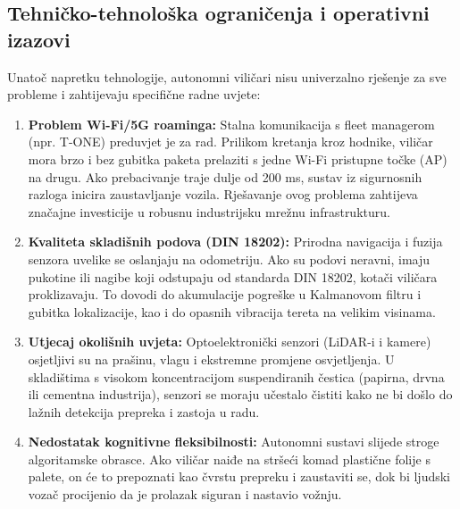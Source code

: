 \subsection{Tehničko-tehnološka ograničenja i operativni izazovi}
Unatoč napretku tehnologije, autonomni viličari nisu univerzalno rješenje za sve probleme i zahtijevaju specifične radne uvjete:
\begin{enumerate}
    \item \textbf{Problem Wi-Fi/5G roaminga:} Stalna komunikacija s fleet managerom (npr. T-ONE) preduvjet je za rad. Prilikom kretanja kroz hodnike, viličar mora brzo i bez gubitka paketa prelaziti s jedne Wi-Fi pristupne točke (AP) na drugu. Ako prebacivanje traje dulje od 200 ms, sustav iz sigurnosnih razloga inicira zaustavljanje vozila. Rješavanje ovog problema zahtijeva značajne investicije u robusnu industrijsku mrežnu infrastrukturu.
    \item \textbf{Kvaliteta skladišnih podova (DIN 18202):} Prirodna navigacija i fuzija senzora uvelike se oslanjaju na odometriju. Ako su podovi neravni, imaju pukotine ili nagibe koji odstupaju od standarda DIN 18202, kotači viličara proklizavaju. To dovodi do akumulacije pogreške u Kalmanovom filtru i gubitka lokalizacije, kao i do opasnih vibracija tereta na velikim visinama.
    \item \textbf{Utjecaj okolišnih uvjeta:} Optoelektronički senzori (LiDAR-i i kamere) osjetljivi su na prašinu, vlagu i ekstremne promjene osvjetljenja. U skladištima s visokom koncentracijom suspendiranih čestica (papirna, drvna ili cementna industrija), senzori se moraju učestalo čistiti kako ne bi došlo do lažnih detekcija prepreka i zastoja u radu.
    \item \textbf{Nedostatak kognitivne fleksibilnosti:} Autonomni sustavi slijede stroge algoritamske obrasce. Ako viličar naiđe na stršeći komad plastične folije s palete, on će to prepoznati kao čvrstu prepreku i zaustaviti se, dok bi ljudski vozač procijenio da je prolazak siguran i nastavio vožnju.
\end{enumerate}

